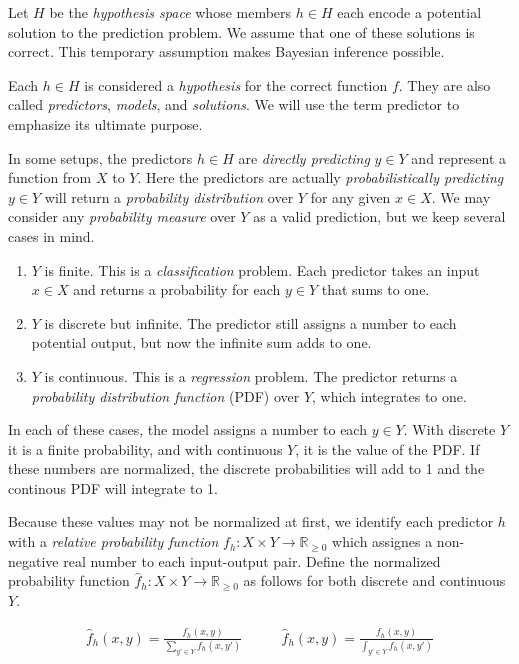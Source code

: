 \documentclass[twoside]{article}
\begin{document}
Let \(H\) be the \textit{hypothesis space} whose members \(h \in H\) each encode a potential solution to the prediction problem. We assume that one of these solutions is correct. This temporary assumption makes Bayesian inference possible.

Each \(h \in H\) is considered a \textit{hypothesis} for the correct function \(f\). They are also called \textit{predictors}, \textit{models}, and \textit{solutions}. We will use the term predictor to emphasize its ultimate purpose.

In some setups, the predictors \(h \in H\) are \textit{directly predicting} \(y \in Y\) and represent a function from \(X\) to \(Y\). Here the predictors are actually \textit{probabilistically predicting} \(y \in Y\) will return a \textit{probability distribution} over \(Y\) for any given \(x \in X\). We may consider any \textit{probability measure} over \(Y\) as a valid prediction, but we keep several cases in mind.

\begin{enumerate}
	\item \(Y\) is finite. This is a \textit{classification} problem. Each predictor takes an input \(x \in X\) and returns a probability for each \(y \in Y\) that sums to one.
	\item \(Y\) is discrete but infinite. The predictor still assigns a number to each potential output, but now the infinite sum adds to one.
	\item \(Y\) is continuous. This is a \textit{regression} problem. The predictor returns a \textit{probability distribution function} (PDF) over \(Y\), which integrates to one.
\end{enumerate}

In each of these cases, the model assigns a number to each \(y \in Y\). With discrete \(Y\) it is a finite probability, and with continuous \(Y\), it is the value of the PDF. If these numbers are normalized, the discrete probabilities will add to 1 and the continous PDF will integrate to 1.

Because these values may not be normalized at first, we identify each predictor \(h\) with a \textit{relative probability function} \(f_h: X \times Y \rightarrow \mathbb{R}_{\geq 0}\) which assignes a non-negative real number to each input-output pair. Define the normalized probability function \(\hat{f}_h: X \times Y \rightarrow \mathbb{R}_{\geq 0}\) as follows for both discrete and continuous \(Y\).

\begin{align}
\label{eq:normalized_probability_model}
\hat{f}_h(x, y)=\frac{f_h(x, y)}{\sum_{y' \in Y} f_h(x,y')} &
\qquad\hat{f}_h(x, y)=\frac{f_h(x, y)}{\int_{y' \in Y} f_h(x,y')}
\end{align}
\end{document}
